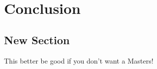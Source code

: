 
\chapter[CONCLUSION]{Conclusion} \label{concl}

\section{New Section}
This better be good if you don't want a Masters!
